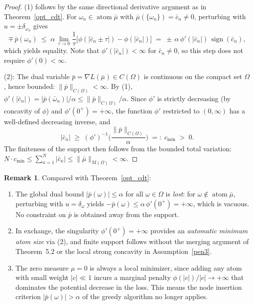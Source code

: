 \documentclass[12pt,fleqn]{amsart}
\theoremstyle{definition}
\newtheorem{remark}{Remark}
\DeclareMathOperator*{\atom}{atom}
\DeclareMathOperator*{\sign}{sign}
\begin{document}
\begin{proof}
(1) follows by the same directional derivative argument as in Theorem~\ref{opt_cdt}.
For $\omega_n \in \atom\bar{\mu}$ with $\bar{\mu}(\{\omega_n\}) = \bar{c}_n \neq 0$,
perturbing with $u = \pm\delta_{\omega_n}$ gives
\[
	\mp\,\bar{p}(\omega_n)
	\;\le\; \alpha\,\lim_{\tau \to 0}\frac{1}{\tau}
	\bigl[\phi(|\bar{c}_n \pm \tau|) - \phi(|\bar{c}_n|)\bigr]
	\;=\; \pm\,\alpha\,\phi'(|\bar{c}_n|)\,\sign(\bar{c}_n),
\]
which yields equality. Note that $\phi'(|\bar{c}_n|) < \infty$ for $\bar{c}_n \neq 0$,
so this step does not require $\phi'(0) < \infty$.

\medskip\noindent
(2): The dual variable $\bar{p} = \nabla L(\bar{\mu}) \in C(\Omega)$
is continuous on the compact set $\Omega$, hence bounded:
$\|\bar{p}\|_{C(\Omega)} < \infty$.
By (1), $\phi'(|\bar{c}_n|) = |\bar{p}(\bar{\omega}_n)|/\alpha
\le \|\bar{p}\|_{C(\Omega)}/\alpha$.
Since $\phi'$ is strictly decreasing (by concavity of $\phi$) and
$\phi'(0^+) = +\infty$, the function $\phi'$ restricted to $(0,\infty)$
has a well-defined decreasing inverse, and
\[
	|\bar{c}_n| \;\ge\; (\phi')^{-1}\!\Big(\frac{\|\bar{p}\|_{C(\Omega)}}{\alpha}\Big)
	\;=:\; c_{\min} \;>\; 0.
\]
The finiteness of the support then follows from the bounded total variation:
$N \cdot c_{\min} \le \sum_{n=1}^N |\bar{c}_n| \le \|\bar{\mu}\|_{M(\Omega)} < \infty$.
\end{proof}

\begin{remark}
Compared with Theorem~\ref{opt_cdt}:
\begin{enumerate}
	\item The global dual bound $|\bar{p}(\omega)| \le \alpha$ for all $\omega \in \Omega$
	is \emph{lost}: for $\omega \notin \atom\bar{\mu}$, perturbing with
	$u = \delta_\omega$ yields
	$-\bar{p}(\omega) \le \alpha\,\phi'(0^+) = +\infty$, which is vacuous.
	No constraint on $\bar{p}$ is obtained away from the support.
	\item In exchange, the singularity $\phi'(0^+) = +\infty$ provides an
	\emph{automatic minimum atom size} via (2), and finite support
	follows without the merging argument of Theorem~5.2 or
	the local strong concavity in Assumption~\ref{pen3}.
	\item The zero measure $\mu = 0$ is always a local minimizer,
	since adding any atom with small weight $|c| \ll 1$ incurs a
	marginal penalty $\phi(|c|)/|c| \to +\infty$ that dominates the
	potential decrease in the loss.
	This means the node insertion criterion $|\bar{p}(\omega)| > \alpha$
	of the greedy algorithm no longer applies.
\end{enumerate}
\end{remark}
\end{document}
